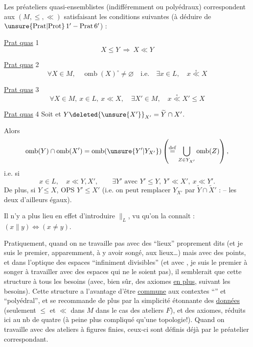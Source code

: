 Les préateliers quasi-ensemblistes (indifféremment  ou polyédraux) correspondent aux $(M,\leq,\ll)$ satisfaisant les conditions suivantes (à déduire de $\unsure{\mathrm{Prat}|\mathrm{Prot}}\,1'-\mathrm{Prat}\,6'$) :

\uline{Prat quas} 1
\[
X\leq Y\ \Rightarrow\ X\ll Y
\]

\uline{Prat quas} 2
\[
\forall X\in M,\quad\operatorname{omb}(X)^\circ\ne\varnothing\quad\text{i.e.}\quad\exists x\in L,\quad x\overset{\circ}{\ll}X
\]

\uline{Prat quas} 3
\[
\forall X\in M,\ x\in L,\ x\ll X,\quad\exists X'\in M,\quad x\overset{\circ}{\ll}X'\leq X
\]

\uline{Prat quas} 4 Soit
 et $Y\deleted{\unsure{X'}}_{X'}=\widetilde Y\cap X'$.

Alors
\[
\operatorname{omb}(Y)\cap\operatorname{omb}(X')=\operatorname{omb}(\unsure{Y'|Y_{X'}})\left(\overset{\mathrm{def}}{=}\bigcup_{Z\in Y_{X'}}\operatorname{omb}(Z)\right),
\]
i.e. si
\[
x\in L,\quad x\ll Y,X',\qquad\exists Y'\text{ avec }Y'\leq Y,\ Y'\ll X',\ x\ll Y'.
\]
De plus, si $Y\leq X$, OPS $Y'\leq X'$ (i.e. on peut remplacer $Y_{X'}$ par $\widetilde Y\cap\widetilde X'$ : -- les deux  d'ailleurs égaux).

Il n'y a plus lieu en effet d'introduire $\parallel_L$, vu qu'on la connaît :  $(x\parallel y)\Longleftrightarrow(x\ne y)$.


Pratiquement, quand on ne travaille pas avec des ``lieux'' proprement dits (et je suis le premier, apparemment, à y avoir songé, aux lieux\ldots) mais avec des points, et dans l'optique des espaces ``infiniment divisibles'' (et avec , je suis le premier à songer à travailler  avec des espaces qui ne le soient pas), il semblerait que  cette structure  à tous les besoins (avec, bien sûr, des axiomes \uline{en plus}, suivant les besoins). Cette structure a l'avantage d'être \uline{commune} aux contextes ``'' et ``polyédral'', et se recommande de plus par la simplicité étonnante des \uline{données} (seulement $\leq$ et $\ll$ dans $M$  dans le cas des ateliers $F$), et des axiomes, réduits ici au nb de quatre (à peine plus compliqué qu'une topologie!). Quand on travaille avec des  ateliers à figures finies, ceux-ci sont définis déjà par le préatelier correspondant.

